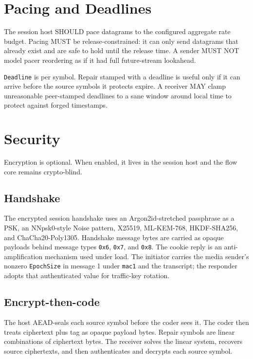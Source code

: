 \documentclass[11pt]{article}
\newcommand{\code}[1]{\ifmmode\text{\texttt{#1}}\else\texttt{#1}\fi}
\newcommand{\field}[1]{\code{#1}}
\begin{document}
\section{Pacing and Deadlines}

The session host SHOULD pace datagrams to the configured aggregate rate budget.
Pacing MUST be release-constrained: it can only send datagrams that already exist
and are safe to hold until the release time. A sender MUST NOT model pacer
reordering as if it had full future-stream lookahead.

\field{Deadline} is per symbol. Repair stamped with a deadline is useful only if
it can arrive before the source symbols it protects expire. A receiver MAY clamp
unreasonable peer-stamped deadlines to a sane window around local time to protect
against forged timestamps.

\section{Security}

Encryption is optional. When enabled, it lives in the session host and the flow
core remains crypto-blind.

\subsection{Handshake}

The encrypted session handshake uses an Argon2id-stretched passphrase as a PSK,
an NNpsk0-style Noise pattern, X25519, ML-KEM-768, HKDF-SHA256, and
ChaCha20-Poly1305. Handshake message bytes are carried as opaque payloads behind
message types \code{0x6}, \code{0x7}, and \code{0x8}. The cookie reply is an
anti-amplification mechanism used under load. The initiator carries the media
sender's nonzero \field{EpochSize} in message 1 under \field{mac1} and the
transcript; the responder adopts that authenticated value for traffic-key
rotation.

\subsection{Encrypt-then-code}

The host AEAD-seals each source symbol before the coder sees it. The coder then
treats ciphertext plus tag as opaque payload bytes. Repair symbols are linear
combinations of ciphertext bytes. The receiver solves the linear system, recovers
source ciphertexts, and then authenticates and decrypts each source symbol.
\end{document}
